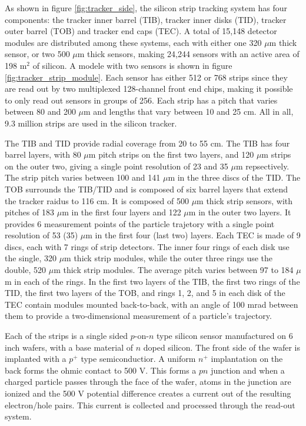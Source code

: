 \par As shown in figure \ref{fig:tracker_side}, the silicon strip
tracking system has four components: the tracker inner barrel (TIB),
tracker inner disks (TID), tracker outer barrel (TOB) and tracker end
caps (TEC).  A total of 15,148 detector modules are distributed among
these systems, each with either one 320 $\mu$m thick sensor, or two
500 $\mu$m thick sensors, making 24,244 sensors with an active area of
198 m$^{2}$ of silicon.  A modele with two sensors is shown in figure
\ref{fig:tracker_strip_module}.  Each sensor has either 512 or 768 strips
since they are read out by two multiplexed 128-channel front end
chips, making it possible to only read out sensors in groups of 256.
Each strip has a pitch that varies between 80 and 200 $\mu$m and
lengths that vary between 10 and 25 cm.  All in all, 9.3 million
strips are used in the silicon tracker.  

\par The TIB and TID provide radial coverage from 20 to 55 cm.  The
TIB has four barrel layers, with 80 $\mu$m pitch strips on the first two
layers, and 120 $\mu$m strips on the outer two, giving a single point
resolution of 23 and 35 $\mu$m repsectively.  The strip pitch varies
between 100 and 141 $\mu$m in the three discs of the TID.  The TOB
surrounds the TIB/TID and is composed of six barrel layers that extend
the tracker raidus to 116 cm.  It is composed of 500 $\mu$m thick
strip sensors, with pitches of 183 $\mu$m in the first four layers and
122 $\mu$m in the outer two layers.  It provides 6 measurement points
of the particle trajetory with a single point resolution of 53 (35)
$\mu$m in the first four (last two) layers.  Each TEC is made of 9
discs, each with 7 rings of strip detectors.  The inner four rings of
each disk use the single, 320 $\mu$m thick strip modules, while the
outer three rings use the double, 520 $\mu$m thick strip modules.  The
average pitch varies between 97 to 184 $\mu$m in each of the rings.
In the first two layers of the TIB, the first two rings of the TID,
the first two layers of the TOB, and rings 1, 2, and 5 in each disk of
the TEC contain modules mounted back-to-back, with an angle of 100
mrad between them to provide a two-dimensional measurement of a
particle's trajectory.  

\par Each of the strips is a single sided $p$-on-$n$ type silicon
sensor manufactured on 6 inch wafers, with a base material of $n$
doped silicon.  The front side of the wafer is implanted with a
$p^{+}$ type semiconductior.  A uniform $n^{+}$ implantation on the
back forms the ohmic contact to 500 V.  This forms a $pn$ junction and
when a charged particle passes through the face of the wafer, atoms in
the junction are ionized and the 500 V potential difference creates a
current out of the resulting electron/hole pairs.  This current is
collected and processed through the read-out system.  

